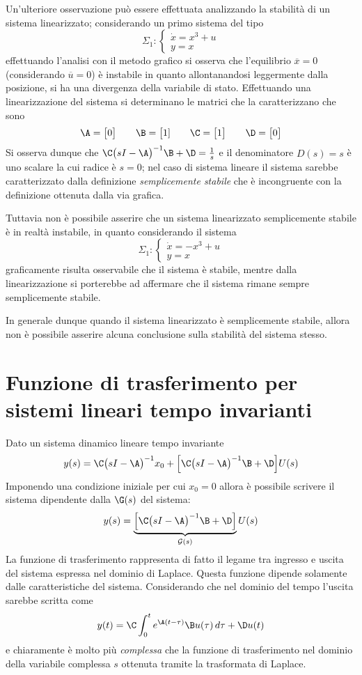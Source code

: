 		Un'ulteriore osservazione può essere effettuata analizzando la stabilità di un sistema linearizzato; considerando un primo sistema del tipo
		\[ \Sigma_1 : \begin{cases}
			\dot x = x^3 + u \\ y = x
		\end{cases}\]
		effettuando l'analisi con il metodo grafico si osserva che l'equilibrio $\overline x = 0$ (considerando $\overline u = 0$) è instabile in quanto allontanandosi leggermente dalla posizione, si ha una divergenza della variabile di stato. Effettuando una linearizzazione del sistema si determinano le matrici che la caratterizzano che sono
		\[ \A= \big[0\big] \qquad \B = \big[1] \qquad \C = \big[ 1\big] \qquad \D = \big[0\big]\]
		Si osserva dunque che $\C \big(sI-\A\big)^{-1} \B + \D = \frac 1 s$ e il denominatore $D(s)=s$ è uno scalare la cui radice è $s=0$; nel caso di sistema lineare il sistema sarebbe caratterizzato dalla definizione \textit{semplicemente stabile} che è incongruente con la definizione ottenuta dalla via grafica.
		
		Tuttavia non è possibile asserire che un sistema linearizzato semplicemente stabile è in realtà instabile, in quanto considerando il sistema
		\[ \Sigma_1 : \begin{cases}
			\dot x = -x^3 + u \\ y = x
		\end{cases}\]
		graficamente risulta osservabile che il sistema è stabile, mentre dalla linearizzazione si porterebbe ad affermare che il sistema rimane sempre semplicemente stabile.
		
		In generale dunque quando il sistema linearizzato è semplicemente stabile, allora non è possibile asserire alcuna conclusione sulla stabilità del sistema stesso.
	
\section{Funzione di trasferimento per sistemi lineari tempo invarianti}
	Dato un sistema dinamico lineare tempo invariante
	\[ y(s) = \C \big(sI-\A\big)^{-1} x_0  + \Big[ \C \big(sI-\A\big)^{-1} \B + \D\Big] U(s) \]
	Imponendo una condizione iniziale per cui $x_0 = 0$ allora è possibile scrivere il sistema dipendente dalla  $\G(s)$ del sistema:
	\[ y(s) =  \underbrace{\Big[ \C \big(sI-\A\big)^{-1} \B + \D\Big]}_{\mathcal G(s)} U(s) \]
	La funzione di trasferimento rappresenta di fatto il legame tra ingresso e uscita del sistema espressa nel dominio di Laplace. Questa funzione dipende solamente dalle caratteristiche del sistema. Considerando che nel dominio del tempo l'uscita sarebbe scritta come
	\[ y(t) = \C \int_0^t e^{\A(t-\tau)} \B u(\tau) \, d\tau + \D u(t) \]
	e chiaramente è molto più \textit{complessa} che la funzione di trasferimento nel dominio della variabile complessa $s$ ottenuta tramite la trasformata di Laplace.
	
